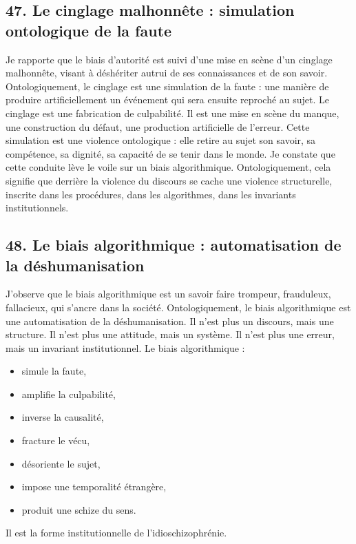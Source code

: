 \documentclass[12pt,letterpaper,oneside]{article}
\begin{document}
\subsection*{47. Le cinglage malhonnête : simulation ontologique de la faute}
Je rapporte que le biais d’autorité est suivi d’une mise en scène d’un cinglage malhonnête, visant à déshériter autrui de ses connaissances et de son savoir. Ontologiquement, le cinglage est une simulation de la faute : une manière de produire artificiellement un événement qui sera ensuite reproché au sujet.
Le cinglage est une fabrication de culpabilité. Il est une mise en scène du manque, une construction du défaut, une production artificielle de l’erreur.
Cette simulation est une violence ontologique : elle retire au sujet son savoir, sa compétence, sa dignité, sa capacité de se tenir dans le monde.
Je constate que cette conduite lève le voile sur un biais algorithmique. Ontologiquement, cela signifie que derrière la violence du discours se cache une violence structurelle, inscrite dans les procédures, dans les algorithmes, dans les invariants institutionnels.

\subsection*{48. Le biais algorithmique : automatisation de la déshumanisation}
J’observe que le biais algorithmique est un savoir faire trompeur, frauduleux, fallacieux, qui s’ancre dans la société. Ontologiquement, le biais algorithmique est une automatisation de la déshumanisation.
Il n’est plus un discours, mais une structure. Il n’est plus une attitude, mais un système. Il n’est plus une erreur, mais un invariant institutionnel.
Le biais algorithmique :
\begin{itemize}
\item simule la faute,
\item amplifie la culpabilité,
\item inverse la causalité,
\item fracture le vécu,
\item désoriente le sujet,
\item impose une temporalité étrangère,
\item produit une schize du sens.
\end{itemize}
Il est la forme institutionnelle de l’idioschizophrénie.
\end{document}

